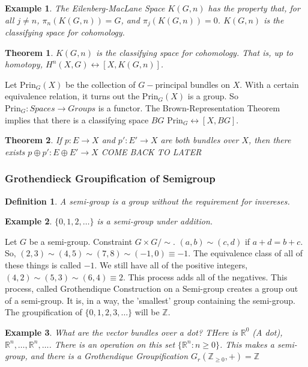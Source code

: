 \documentclass{article}
\theoremstyle{mystyle}
\newtheorem{theorem}{Theorem}[section]
\newtheorem{definition}{Definition}[section]
\newtheorem{example}{Example}[section]
\begin{document}
\begin{example}
The Eilenberg-MacLane Space $K(G,n)$ has the property that, for all $j\ne n$, $\pi_{n}(K(G,n)) = G$, and $\pi_{j}(K(G,n)) = 0$. $K(G,n)$ is the classifying space for cohomology.
\end{example}
\begin{theorem}
$K(G,n)$ is the classifying space for cohomology. That is, up to homotopy, $H^{n}(X,G) \leftrightarrow [X,K(G,n)]$.
\end{theorem}
Let $\textrm{Prin}_{G}(X)$ be the collection of $G-$principal bundles on $X$. With a certain equivalence relation, it turns out the $\textrm{Prin}_{G}(X)$ is a group. So $\textrm{Prin}_{G}:\textit{Spaces}\rightarrow \textit{Groups}$ is a functor. The Brown-Representation Theorem implies that there is a classifying space $BG$ $\textrm{Prin}_{G}\leftrightarrow [X,BG]$.
\begin{theorem}
If $p:E\rightarrow X$ and $p':E'\rightarrow X$ are both bundles over $X$, then there exists $p\oplus p':E\oplus E' \rightarrow X$ COME BACK TO LATER
\end{theorem}
\subsubsection{Grothendieck Groupification of Semigroup}
\begin{definition}
A semi-group is a group without the requirement for invereses.
\end{definition}
\begin{example}
$\{0,1,2,\hdots\}$ is a semi-group under addition.
\end{example}
Let $G$ be a semi-group. Constraint $G\times G/\sim$. $(a,b) \sim (c,d)$ if $a+d = b+c$. So, $(2,3)\sim (4,5) \sim (7,8)\sim (-1,0) \equiv -1$. The equivalence class of all of these things is called $-1$. We still have all of the positive integers, $(4,2)\sim(5,3) \sim(6,4) \equiv 2$. This process adds all of the negatives. This process, called Grothendique Construction on a Semi-group creates a group out of a semi-group. It is, in a way, the 'smallest' group containing the semi-group. The groupification of $\{0,1,2,3,\hdots\}$ will be $\mathbb{Z}$.
\begin{example}
What are the vector bundles over a dot? THere is $\mathbb{R}^{0}$ (A dot), $\mathbb{R}^{n}, \hdots,\mathbb{R}^n,\hdots $. There is an operation on this set $\{\mathbb{R}^{n}:n \geq 0\}$. This makes a semi-group, and there is a Grothendique Groupification $G_{r}(\mathbb{Z}_{\geq 0}, +) = \mathbb{Z}$
\end{example}
\clearpage
\printglossaries
\end{document}
